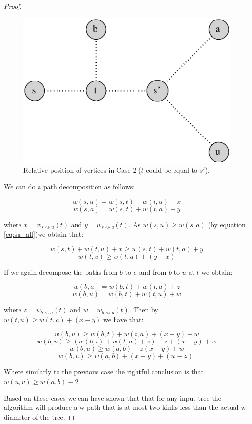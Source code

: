 \begin{proof}
\begin{figure}[h]%
    \centering
    \includegraphics[center, scale=0.4 ]{./images/2xbfs-case-2.eps}
    \caption{Relative position of vertices in Case 2 ($t$ could be equal to $s'$). }%
    \label{fig:case2}%
\end{figure}


We can do a path decomposition as follows:

$$ w(s, u) = w(s, t) + w(t, u) + x $$
$$ w(s, a) = w(s, t) + w(t, a) + y $$

where $x = w_{s \rightsquigarrow u}(t)$ and $y = w_{s \rightsquigarrow a}(t)$. As $w(s, u) \ge w(s, a)$ (by equation \ref{eq:su_all})we obtain that:

$$ w(s, t) + w(t, u) + x  \ge w(s, t) + w(t, a) + y $$
$$ w(t, u) \ge w(t, a) + (y - x) $$

If we again decompose the paths from $b$ to $a$ and from $b$ to $u$ at $t$ we obtain:

$$ w(b, a) = w(b, t) + w(t, a) + z  $$
$$ w(b, u) = w(b, t) + w(t, u) + w  $$

where $z = w_{b \rightsquigarrow a}(t)$ and $w = w_{b \rightsquigarrow u}(t)$. Then by $w(t, u) \ge w(t, a) + (x - y)$ we have that:

$$ w(b, u) \ge w(b, t) + w(t, a) + (x - y) + w $$
$$ w(b, u) \ge (w(b, t) + w(t, a) + z) - z + (x - y) + w $$
$$ w(b, u) \ge w(a, b) - z (x - y) + w $$
$$ w(b, u) \ge w(a, b) + (x - y) + (w - z). $$

Where similarly to the previous case the rightful conclusion is that $ w(u, v) \ge w(a, b) - 2 $.

Based on these cases we can have shown that that for any input tree the algorithm will produce a w-path that is at most two kinks less than the actual w-diameter of the tree.

\end{proof}

